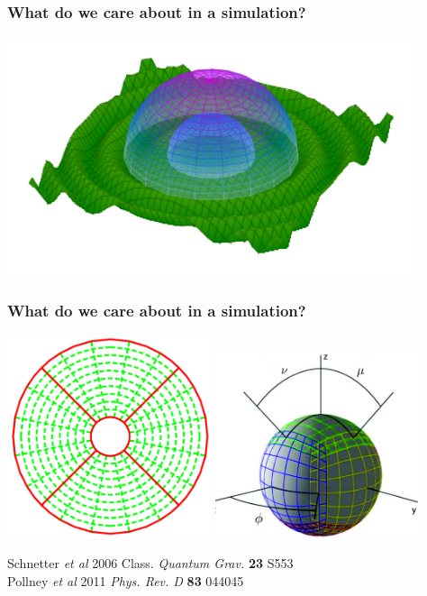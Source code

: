 \documentclass[]{beamer}
\begin{document}
\begin{frame}
  \frametitle{What do we care about in a simulation?}
  \begin{center}
    \includegraphics[width=12cm]{figures/wavey}
  \end{center}
\end{frame}

\begin{frame}
  \frametitle{What do we care about in a simulation?}
    \begin{center}
    \includegraphics[width=6cm]{figures/fourpatches.png}
    \includegraphics[width=6cm]{figures/sixpatches.png}
  \end{center}
  Schnetter \textit{et al} 2006 Class. \textit{Quantum Grav.} \textbf{23} S553\\
  Pollney \textit{et al} 2011 \textit{Phys. Rev. D} \textbf{83} 044045
\end{frame}
\end{document}
